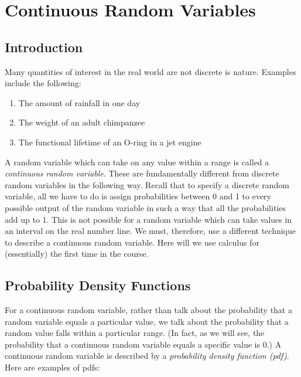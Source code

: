 \documentclass[notes.tex]{subfiles}
\begin{document}
\setcounter{section}{2}
\section{Continuous Random Variables}

\subsection{Introduction}
Many quantities of interest in the real world are not discrete is nature. Examples include the following:
\begin{enumerate}
\item The amount of rainfall in one day
\item The weight of an adult chimpanzee
\item The functional lifetime of an O-ring in a jet engine
\end{enumerate}

A random variable which can take on any value within a range is called a \emph{continuous random variable}. These are fundamentally different from discrete random variables in the following way. Recall that to specify a discrete random variable, all we have to do is assign probabilities between 0 and 1 to every possible output of the random variable in such a way that all the probabilities add up to 1. This is not possible for a random variable which can take values in an interval on the real number line. We must, therefore, use a different technique to describe a continuous random variable. Here will we use calculus for (essentially) the first time in the course.

\subsection{Probability Density Functions}
For a continuous random variable, rather than talk about the probability that a random variable equals a particular value, we talk about the probability that a random value falls within a particular range. (In fact, as we will see, the probability that a continuous random variable equals a specific value is 0.) A continuous random variable is described by a \emph{probability density function (pdf)}. Here are examples of pdfs:
\end{document}
